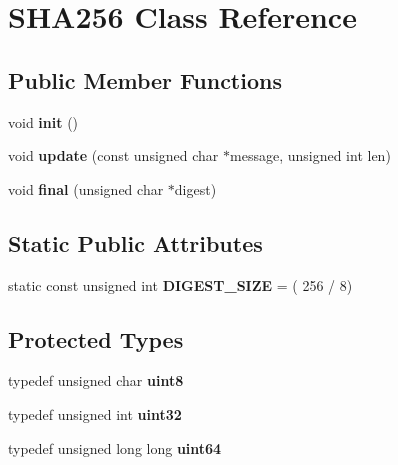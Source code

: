 \hypertarget{classSHA256}{}\section{S\+H\+A256 Class Reference}
\label{classSHA256}
\subsection*{Public Member Functions}
\begin{DoxyCompactItemize}
\item 
\mbox{\label{classSHA256_a9893152e0b8a75ebed254509dfb1eb4a}} 
void {\bfseries init} ()
\item 
\mbox{\label{classSHA256_a2ab5f18a14b4493671e7d0c4a636b4c6}} 
void {\bfseries update} (const unsigned char $\ast$message, unsigned int len)
\item 
\mbox{\label{classSHA256_ae28a257b66be069cc850d49dfe3d48f9}} 
void {\bfseries final} (unsigned char $\ast$digest)
\end{DoxyCompactItemize}
\subsection*{Static Public Attributes}
\begin{DoxyCompactItemize}
\item 
\mbox{\label{classSHA256_a62ea97291cac7ce713ac2cf69219851b}} 
static const unsigned int {\bfseries D\+I\+G\+E\+S\+T\+\_\+\+S\+I\+ZE} = ( 256 / 8)
\end{DoxyCompactItemize}
\subsection*{Protected Types}
\begin{DoxyCompactItemize}
\item 
\mbox{\label{classSHA256_a2d30c8d80b241471affd735f5f5e9925}} 
typedef unsigned char {\bfseries uint8}
\item 
\mbox{\label{classSHA256_a90dbb66f84c4c8c985aaa099a0ef3b54}} 
typedef unsigned int {\bfseries uint32}
\item 
\mbox{\label{classSHA256_a4c998d0c4b147e28438e6b5749cb987e}} 
typedef unsigned long long {\bfseries uint64}
\end{DoxyCompactItemize}
